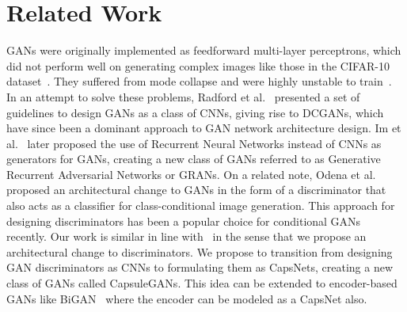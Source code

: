 \section{Related Work}
\label{sec:related_work}

GANs were originally implemented as feedforward multi-layer perceptrons, which did not perform well on generating complex images like those in the CIFAR-10 dataset~\cite{bib:cifar}. They suffered from mode collapse and were highly unstable to train~\cite{bib:dcgan, bib:igan}. In an attempt to solve these problems, Radford et al.~\cite{bib:dcgan} presented a set of guidelines to design GANs as a class of CNNs, giving rise to DCGANs, which have since been a dominant approach to GAN network architecture design. Im et al.~\cite{bib:gran} later proposed the use of Recurrent Neural Networks instead of CNNs as generators for GANs, creating a new class of GANs referred to as Generative Recurrent Adversarial Networks or GRANs. On a related note, Odena et al.~\cite{bib:acgan} proposed an architectural change to GANs in the form of a discriminator that also acts as a classifier for class-conditional image generation. This approach for designing discriminators has been a popular choice for conditional GANs~\cite{bib:cgan} recently. Our work is similar in line with~\cite{bib:acgan} in the sense that we propose an architectural change to discriminators. We propose to transition from designing GAN discriminators as CNNs to formulating them as CapsNets, creating a new class of GANs called CapsuleGANs. This idea can be extended to encoder-based GANs like BiGAN~\cite{bib:bigan} where the encoder can be modeled as a CapsNet also.
